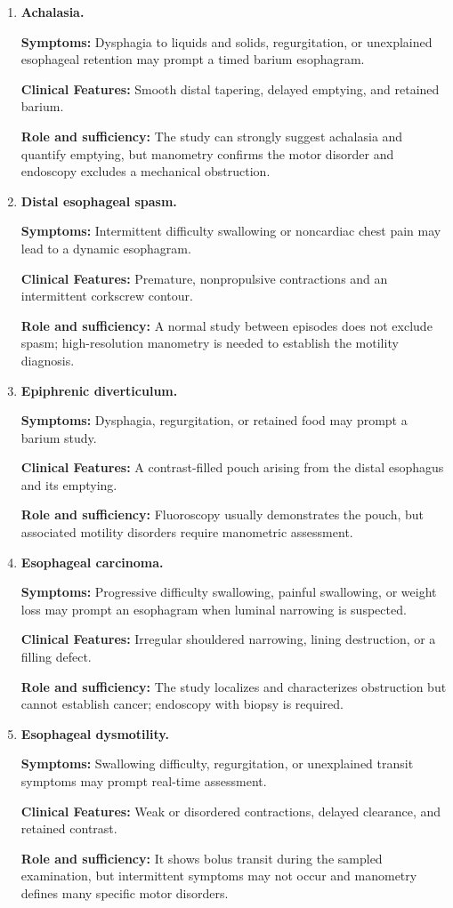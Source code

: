 \begin{enumerate}[leftmargin=*,itemsep=0.45em,topsep=0.4em]
\item \textbf{Achalasia.}\par\noindent\textbf{Symptoms:} Dysphagia to liquids and solids, regurgitation, or unexplained esophageal retention may prompt a timed barium esophagram.\par\noindent\textbf{Clinical Features:} Smooth distal tapering, delayed emptying, and retained barium.\par\noindent\textbf{Role and sufficiency:} The study can strongly suggest achalasia and quantify emptying, but manometry confirms the motor disorder and endoscopy excludes a mechanical obstruction.
\item \textbf{Distal esophageal spasm.}\par\noindent\textbf{Symptoms:} Intermittent difficulty swallowing or noncardiac chest pain may lead to a dynamic esophagram.\par\noindent\textbf{Clinical Features:} Premature, nonpropulsive contractions and an intermittent corkscrew contour.\par\noindent\textbf{Role and sufficiency:} A normal study between episodes does not exclude spasm; high-resolution manometry is needed to establish the motility diagnosis.
\item \textbf{Epiphrenic diverticulum.}\par\noindent\textbf{Symptoms:} Dysphagia, regurgitation, or retained food may prompt a barium study.\par\noindent\textbf{Clinical Features:} A contrast-filled pouch arising from the distal esophagus and its emptying.\par\noindent\textbf{Role and sufficiency:} Fluoroscopy usually demonstrates the pouch, but associated motility disorders require manometric assessment.
\item \textbf{Esophageal carcinoma.}\par\noindent\textbf{Symptoms:} Progressive difficulty swallowing, painful swallowing, or weight loss may prompt an esophagram when luminal narrowing is suspected.\par\noindent\textbf{Clinical Features:} Irregular shouldered narrowing, lining destruction, or a filling defect.\par\noindent\textbf{Role and sufficiency:} The study localizes and characterizes obstruction but cannot establish cancer; endoscopy with biopsy is required.
\item \textbf{Esophageal dysmotility.}\par\noindent\textbf{Symptoms:} Swallowing difficulty, regurgitation, or unexplained transit symptoms may prompt real-time assessment.\par\noindent\textbf{Clinical Features:} Weak or disordered contractions, delayed clearance, and retained contrast.\par\noindent\textbf{Role and sufficiency:} It shows bolus transit during the sampled examination, but intermittent symptoms may not occur and manometry defines many specific motor disorders.

\end{enumerate}
